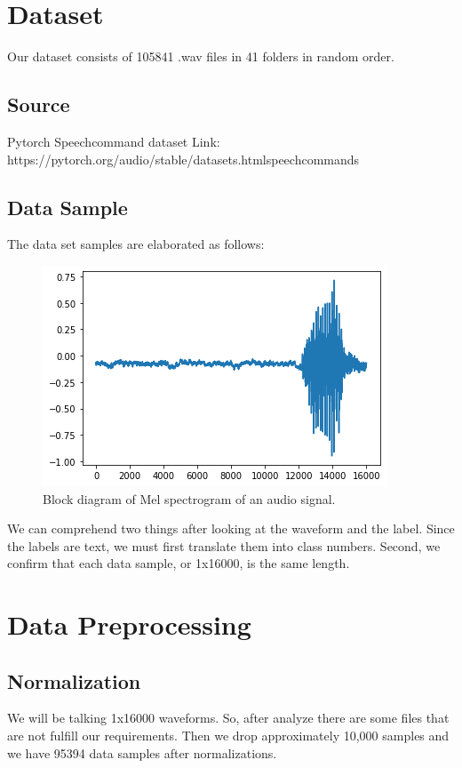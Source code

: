 \section{Dataset }
Our dataset consists of 105841 .wav files in 41 folders in random order. 

\subsection{Source }
Pytorch Speechcommand dataset Link:  https://pytorch.org/audio/stable/datasets.htmlspeechcommands
\subsection{Data Sample  }
The data set samples are elaborated as follows:
    \begin{figure}[ht]
            \centering
            \includegraphics[scale=1]{images/figure4.png}
            \caption{Block diagram of Mel spectrogram of an audio signal.}
            \label{fig: Block diagram of Mel spectrogram of an audio signal}
            \end{figure}
We can comprehend two things after looking at the waveform and the label. Since the labels are text, we must first translate them into class numbers. Second, we confirm that each data sample, or 1x16000, is the same length.            
\section{Data Preprocessing }
\subsection{Normalization}
We will be talking 1x16000 waveforms.  So, after analyze there are some files that are not fulfill our requirements. Then we drop approximately 10,000 samples and we have 95394 data samples after normalizations.